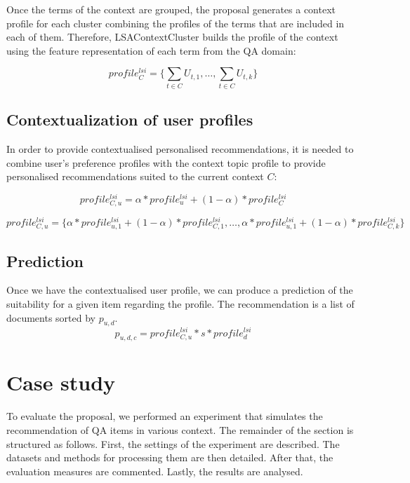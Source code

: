 \documentclass[preprint]{elsarticle}
\begin{document}
\begin{spacing}{1.5}
Once the terms of the context are grouped, the proposal generates a context profile for each cluster combining the profiles of the terms that are included in each of them. Therefore, LSAContextCluster builds the profile of the context using the feature representation of each term from the QA domain:

\begin{equation}
	profile^{lsi}_{C} = \{\sum_{t \in C} U_{t,1}, \dots, \sum_{t \in C} U_{t,k} \}
\end{equation}

\subsection{Contextualization of user profiles}

In order to provide contextualised personalised recommendations, it is needed to combine user's preference profiles with the context topic profile to provide personalised recommendations suited to the current context $C$:

\begin{equation}
	profile^{lsi}_{C,u} = \alpha * profile^{lsi}_u + (1- \alpha )*profile^{lsi}_{C}
\end{equation}

\begin{equation}
	profile^{lsi}_{C,u} = \{ \alpha * profile^{lsi}_{u,1} + (1- \alpha ) * profile^{lsi}_{C,1},\dots, \alpha * profile^{lsi}_{u,1} + ( 1 - \alpha ) * profile^{lsi}_{C,k} \}
\end{equation}

\subsection{Prediction}

Once we have the contextualised user profile, we can produce a prediction of the suitability for a given item regarding the profile. The recommendation is a list of documents sorted by $p_{u,d}$.\begin{equation}
	p_{u,d,c} = profile^{lsi}_{C,u}*s*profile^{lsi}_d
\end{equation}

\section{Case study}
\label{sec:case-study}

To evaluate the proposal, we performed an experiment that simulates the recommendation of QA items in various context. The remainder of the section is structured as follows. First, the settings of the experiment are described. The datasets and methods for processing them are then detailed. After that, the evaluation measures are commented. Lastly, the results are analysed.


\end{spacing}
\end{document}
